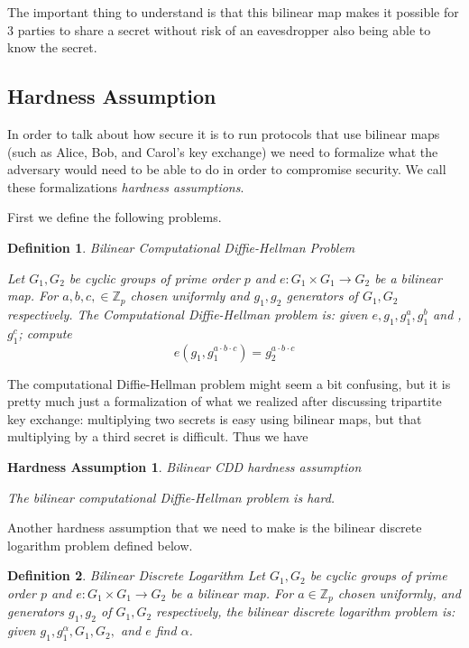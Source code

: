 \documentclass[12pt,twoside]{reedthesis}
\newtheorem{definition}{Definition}
\newtheorem{assumption}{Hardness Assumption}
\newcommand{\Z}[0]{\mathbb{Z}}
\begin{document}
\par The important thing to understand is that this bilinear map makes it possible for 3 parties to share a secret without risk of an eavesdropper also being able to know the secret. 


    \subsection{Hardness Assumption}
    
    In order to talk about how secure it is to run protocols that use bilinear maps (such as Alice, Bob, and Carol's key exchange) we need to formalize what the adversary would need to be able to do in order to compromise security. We call these formalizations \textit{hardness assumptions}.
    \par First we define the following problems.
    
    \begin{definition}{Bilinear Computational Diffie-Hellman Problem}
    \par Let $G_1,G_2$ be cyclic groups of prime order $p$ and $e:G_1 \times G_1 \to G_2$ be a bilinear map. For $a,b,c,\in \Z_p$ chosen uniformly and $g_1,g_2$ generators of $G_1,G_2$ respectively. The Computational Diffie-Hellman problem is: given $e,g_1,g_1^a,g_1^b$ and ,$g_1^c$; compute $$e(g_1,g_1^{a\cdot b \cdot c}) = g_2^{a\cdot b \cdot c}$$
    \end{definition}
    
    The computational Diffie-Hellman problem might seem a bit confusing, but it is pretty much just a formalization of what we realized after discussing tripartite key exchange: multiplying two secrets is easy using bilinear maps, but that multiplying by a third secret is difficult. Thus we have
    \begin{assumption}{Bilinear CDD hardness assumption}
    \par The bilinear computational Diffie-Hellman problem is hard.
        \end{assumption}
        
        \par Another hardness assumption that we need to make is the bilinear discrete logarithm problem defined below.
       
    \begin{definition}{Bilinear Discrete Logarithm}
    Let $G_1,G_2$ be cyclic groups of prime order $p$ and $e:G_1 \times G_1 \to G_2$ be a bilinear map. For $a \in \Z_p$ chosen uniformly, and generators $g_1,g_2$ of $G_1,G_2$ respectively, the bilinear discrete logarithm problem is: given $g_1,g_1^\alpha, G_1, G_2,$ and $e$ find $\alpha$.
    \end{definition}
    
\end{document}
